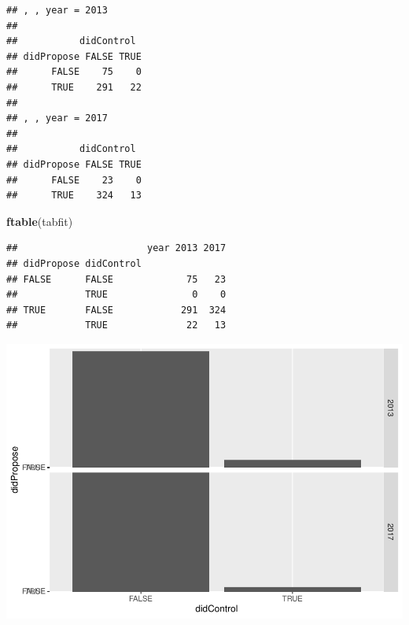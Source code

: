 \documentclass[]{article}
\newenvironment{Shaded}{\begin{snugshade}}{\end{snugshade}}
\newcommand{\DataTypeTok}[1]{\textcolor[rgb]{0.13,0.29,0.53}{#1}}
\newcommand{\KeywordTok}[1]{\textcolor[rgb]{0.13,0.29,0.53}{\textbf{#1}}}
\newcommand{\NormalTok}[1]{#1}
\newcommand{\OperatorTok}[1]{\textcolor[rgb]{0.81,0.36,0.00}{\textbf{#1}}}
\newcommand{\StringTok}[1]{\textcolor[rgb]{0.31,0.60,0.02}{#1}}
\begin{document}
\begin{verbatim}
## , , year = 2013
## 
##           didControl
## didPropose FALSE TRUE
##      FALSE    75    0
##      TRUE    291   22
## 
## , , year = 2017
## 
##           didControl
## didPropose FALSE TRUE
##      FALSE    23    0
##      TRUE    324   13
\end{verbatim}

\begin{Shaded}
\begin{Highlighting}[]
\KeywordTok{ftable}\NormalTok{(tabfit)}
\end{Highlighting}
\end{Shaded}

\begin{verbatim}
##                       year 2013 2017
## didPropose didControl               
## FALSE      FALSE             75   23
##            TRUE               0    0
## TRUE       FALSE            291  324
##            TRUE              22   13
\end{verbatim}

\begin{Shaded}
\end{Shaded}

\includegraphics{ProposalAnalysis_files/figure-latex/unnamed-chunk-8-1.pdf}
\end{document}
